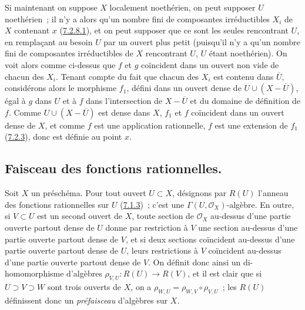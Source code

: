 Si maintenant on suppose $X$ localement noethérien, on peut supposer $U$
noethérien~; il n'y a alors qu'un nombre fini de composantes irréductibles
$X_i$ de $X$ contenant $x$ (\hyperref[I.7.2.8.1-fr]{7.2.8.1}), et on peut
supposer que ce sont les seules rencontrant $U$, en remplaçant au besoin $U$
par un ouvert plus petit (puisqu'il n'y a qu'un nombre fini de composantes
irréductibles de $X$ rencontrant $U$, $U$ étant noethérien). On voit alors
comme ci-dessus que $f$ et $g$ coïncident dans un ouvert non vide de chacun
des $X_i$. Tenant compte du fait que chacun des $X_i$ est contenu dans
$\overline U$, considérons alors le morphisme $f_1$, défini dans un ouvert
dense de $U\cup(X-\overline U)$, égal à $g$ dans $U$ et à $f$ dans
l'intersection de $X-\overline U$ et du domaine de définition de $f$. Comme
$U\cup(X-\overline U)$ est dense dans $X$, $f_1$ et $f$ coïncident dans un
ouvert dense de $X$, et comme $f$ est une application rationnelle, $f$ est
une extension de $f_1$ (\hyperref[I.7.2.3-fr]{7.2.3}), donc est définie au
point $x$.

\subsection{Faisceau des fonctions rationnelles.}
\label{subsection:I.7.3-fr}

\begin{env}[7.3.1]
\label{I.7.3.1-fr}
Soit $X$ un préschéma. Pour tout ouvert $U\subset X$, désignons par $R(U)$
l'anneau des fonctions rationnelles sur $U$
(\hyperref[I.7.1.3-fr]{7.1.3})~; c'est une
$\Gamma(U,\mathscr{O}_X)$-algèbre. En outre, si $V\subset U$ est un second
ouvert de $X$, toute section de $\mathscr{O}_X$ au-dessus d'une partie
ouverte partout dense de $U$ donne par restriction à $V$ une section
au-dessus d'une partie ouverte partout dense de $V$, et si deux sections
coïncident au-dessus d'une partie ouverte partout dense de $U$, leurs
restrictions à $V$ coïncident au-dessus d'une partie ouverte partout dense de
$V$. On définit donc ainsi un di-homomorphisme d'algèbres
$\rho_{V,U}:R(U)\to R(V)$, et il est clair que si $U\supset V\supset W$ sont
trois ouverts de $X$, on a
$\rho_{W,U}=\rho_{W,V}\circ\rho_{V,U}$~; les $R(U)$ définissent donc un
\emph{préfaisceau} d'algèbres sur $X$.
\end{env}

